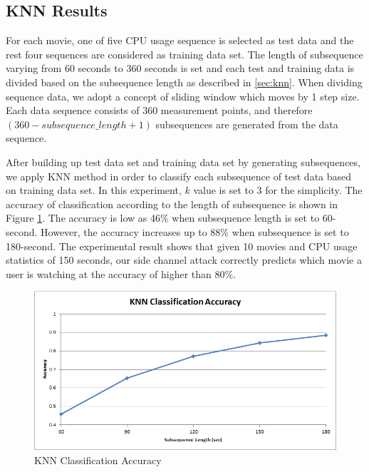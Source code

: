 \subsection{KNN Results}

For each movie, one of five CPU usage sequence is selected as test data and the rest four sequences are considered as training data set. 
The length of subsequence varying from 60 seconds to 360 seconds is set and each test and training data is divided based on the subsequence length as described in \ref{sec:knn}.
When dividing sequence data, we adopt a concept of sliding window which moves by 1 step size.
Each data sequence consists of $360$ measurement points, and therefore $(360 - subsequence\_length + 1)$ subsequences are generated from the data sequence. 

After building up test data set and training data set by generating subsequences, we apply KNN method in order to classify each subsequence of test data based on training data set. 
In this experiment, $k$ value is set to 3 for the simplicity.
The accuracy of classification according to the length of subsequence is shown in Figure \ref{fig:experiment_knn}.
The accuracy is low as 46$\%$ when subsequence length is set to 60-second.
However, the accuracy increases up to 88$\%$ when subsequence is set to 180-second.
The experimental result shows that given 10 movies and CPU usage statistics of 150 seconds, our side channel attack correctly predicts which movie a user is watching at the accuracy of higher than 80$\%$.

\begin{figure}[!h]
\centering
\includegraphics[scale=0.50]{Figures/experiment_knn}
\caption{KNN Classification Accuracy}
\label{fig:experiment_knn}
\vspace{-5mm}
\end{figure}
